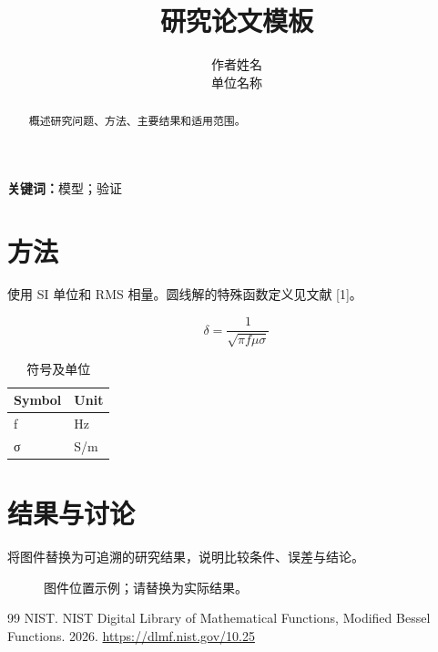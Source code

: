\documentclass[11pt,a4paper]{article}
\begin{document}
\title{研究论文模板}
\author{作者姓名\\单位名称}
\date{}
\maketitle
\begin{abstract}
概述研究问题、方法、主要结果和适用范围。
\end{abstract}
\noindent\textbf{关键词：}模型；验证\par
\section{方法}
\hypertarget{chapter-01}{}
使用 SI 单位和 RMS 相量。圆线解的特殊函数定义见文献 [1]。

\begin{equation}\delta=\frac{1}{\sqrt{\pi f\mu\sigma}}\label{eq:skin}\end{equation}
\begin{table}[!htbp]
\centering
\caption{符号及单位}
\begingroup\footnotesize
\begin{tabularx}{\textwidth}{>{\raggedright\arraybackslash}X>{\raggedright\arraybackslash}X}
\toprule
Symbol & Unit\\
\midrule
f & Hz\\
σ & S/m\\
\bottomrule
\end{tabularx}\endgroup
\end{table}
\section{结果与讨论}
\hypertarget{chapter-02}{}
将图件替换为可追溯的研究结果，说明比较条件、误差与结论。

\renewcommand{\refname}{参考文献}
\begin{figure}[!htbp]\centering\fbox{\rule{0pt}{22mm}\rule{.8\linewidth}{0pt}}\caption{图件位置示例；请替换为实际结果。}\label{fig:example}\end{figure}
\begin{thebibliography}{99}
 NIST. NIST Digital Library of Mathematical Functions, Modified Bessel Functions. 2026. \url{https://dlmf.nist.gov/10.25}
\end{thebibliography}
\end{document}
